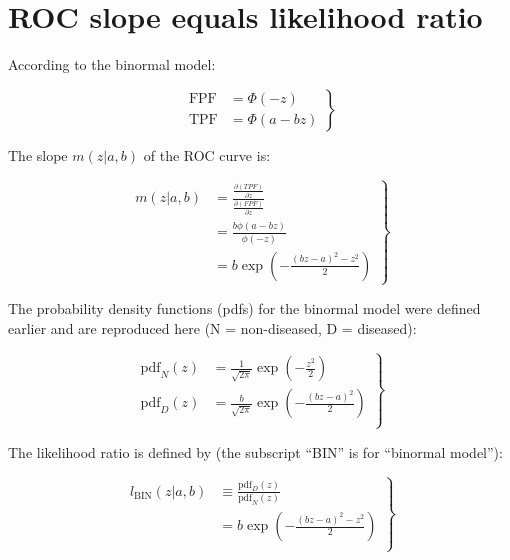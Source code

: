\documentclass[
]{book}
\begin{document}
\hypertarget{proper-roc-models-likelihood-ratio-theorem1}{%
\section{ROC slope equals likelihood ratio}\label{proper-roc-models-likelihood-ratio-theorem1}}

According to the binormal model:

\begin{equation} 
\left.\begin{aligned}
\text{FPF}&=\Phi\left( -z \right)\\
\text{TPF}&=\Phi\left( a-bz \right)
\end{aligned}
\right\}
\label{eq:proper-roc-models-binormal-model}
\end{equation}

The slope \(m\left( z|a,b \right)\) of the ROC curve is:

\begin{equation} 
\left.\begin{aligned}
m\left( z|a,b \right)&=\frac{\frac{\partial \left( TPF \right)}{\partial z}}{\frac{\partial \left( FPF \right)}{\partial z}}\\ 
&=\frac{b\phi\left( a-bz \right)}{\phi\left( -z \right)}\\ 
&=b\exp\left( -\frac{\left( bz-a \right)^2 - z^2}{2} \right)
\end{aligned}\right\}
\label{eq:proper-roc-models-slope}
\end{equation}

The probability density functions (pdfs) for the binormal model were defined earlier and are reproduced here (N = non-diseased, D = diseased):

\begin{equation} 
\left.\begin{aligned}
\text{pdf}_N\left( z \right) &= \frac{1}{\sqrt{2\pi}}\exp\left( -\frac{z^2}{2} \right) \\
\text{pdf}_D\left( z \right) &= \frac{b}{\sqrt{2\pi}}\exp\left( -\frac{\left( bz-a \right)^2}{2} \right) \\
\end{aligned}\right\}
\label{eq:proper-roc-models-pdfs}
\end{equation}

The likelihood ratio is defined by (the subscript ``BIN'' is for ``binormal model''):

\begin{equation} 
\left.\begin{aligned}
l_{\text{BIN}}\left( z | a,b\right) &\equiv \frac{\text{pdf}_D\left( z \right)}{\text{pdf}_N\left( z \right)} \\
&= b\exp\left( -\frac{\left( bz-a \right)^2 -z^2}{2} \right) \\
\end{aligned}\right\}
\label{eq:proper-roc-models-likelihood-ratio}
\end{equation}
\end{document}
